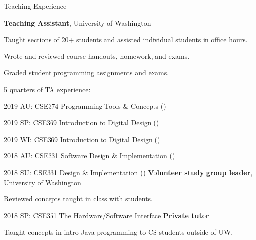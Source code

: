 \begin{rubric}{Teaching Experience}

\entry*[2018 -- 2019]%
	\textbf{Teaching Assistant}, University of Washington
	\par Taught sections of 20+ students and assisted individual students in office hours.
	\par Wrote and reviewed course handouts, homework, and exams.
	\par Graded student programming assignments and exams.
	\par 5 quarters of TA experience:
	\par 2019 AU: CSE374 Programming Tools \& Concepts (\pPirtleT{})
	\par 2019 SP: CSE369 Introduction to Digital Design (\pHsiaJ{})
	\par 2019 WI: CSE369 Introduction to Digital Design (\pHsiaJ{})
	\par 2018 AU: CSE331 Software Design \& Implementation (\pErnstM{})
	\par 2018 SU: CSE331 Design \& Implementation (\pPerlmutterL{})
\entry*[2018]%
	\textbf{Volunteer study group leader}, University of Washington
	\par Reviewed concepts taught in class with students.
	\par 2018 SP: CSE351 The Hardware/Software Interface
\entry*[2017]%
	\textbf{Private tutor}
	\par Taught concepts in intro Java programming to CS students outside of UW.
\end{rubric}